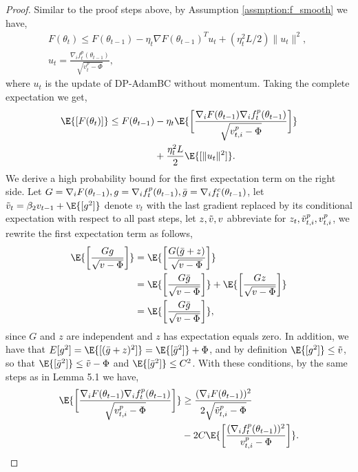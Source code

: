 \documentclass[letterpaper]{article} %
\begin{document}
\begin{proof}
    Similar to the proof steps above, by Assumption \ref{assmption:f_smooth} we have,
    \begin{gather*}
        F(\theta_t) \leq F(\theta_{t-1}) - \eta_t \nabla F(\theta_{t-1})^T u_t + (\eta_t^2 L/2) \lVert u_t \rVert^2, \; \\
        u_t = \frac{\nabla_i f_t^{p}(\theta_{t-1})}{\sqrt{v_t^{p} - \Phi}},
    \end{gather*}
    where $u_t$ is the update of DP-AdamBC without momentum.
    Taking the complete expectation we get,
    \begin{align*}
        \E{[F(\theta_t)]} \leq F(\theta_{t-1}) &- \eta_t \E{\bigg[\frac{\nabla_i F(\theta_{t-1}) \nabla_i f_t^{p}(\theta_{t-1})}{\sqrt{v_{t, i}^{p} - \Phi }}\bigg]}\\ &+ \frac{\eta_t^2 L}{2}\E{[\lVert u_t \rVert^2]}.
    \end{align*}
    We derive a high probability bound for the first expectation term on the right side.
    Let $G=\nabla_i F(\theta_{t-1}), g=\nabla_i f_t^{p}(\theta_{t-1}), \Bar{g}=\nabla_i f_t^{c}(\theta_{t-1})$, let $\Tilde{v}_t=\beta_2 v_{t-1}+\E{[g^2]}$ denote $v_t$ with the last gradient replaced by its conditional expectation with respect to all past steps, let $z, \Tilde{v}, v$ abbreviate for $z_t, \Tilde{v}_{t, i}^{p}, v_{t, i}^{p}$, we rewrite the first expectation term as follows,
    \begin{align*}
        \E{\bigg[ \frac{Gg}{\sqrt{v - \Phi}} \bigg]} &= \E{\bigg[ \frac{G(\Bar{g}+z)}{\sqrt{v - \Phi}} \bigg]} \\ &= \E{\bigg[ \frac{G\Bar{g}}{\sqrt{v - \Phi}} \bigg]} + \E{\bigg[ \frac{Gz}{\sqrt{v - \Phi}} \bigg]} \\ &= \E{\bigg[ \frac{G\Bar{g}}{\sqrt{v - \Phi}} \bigg]},
    \end{align*}
    since $G$ and $z$ are independent and $z$ has expectation equals zero. In addition, we have that $E{[g^2]} = \E{[(\Bar{g}+z)^2]} = \E{[\Bar{g}^2]} + \Phi$, and by definition $\E{[g^2]} \leq \Tilde{v}$, so that $\E{[\Bar{g}^2]} \leq \Tilde{v} - \Phi$ and $\E{[\Bar{g}^2]} \leq C^2$. With these conditions, by the same steps as in Lemma 5.1 \citep{défossez2022simple} we have,
    \begin{align*}
        \E{\bigg[\frac{\nabla_i F(\theta_{t-1}) \nabla_i f_t^{p}(\theta_{t-1})}{\sqrt{v_{t, i}^{p} -\Phi }}\bigg]} &\geq \frac{(\nabla_i F(\theta_{t-1}))^2}{2\sqrt{\Tilde{v}_{t,i}^{p}-\Phi}} \\ &- 2C\E{\bigg[ \frac{(\nabla_i f_t^{p}(\theta_{t-1}))^2}{v_{t,i}^{p}-\Phi} \bigg]}.

\end{align*}
\end{proof}
\end{document}
